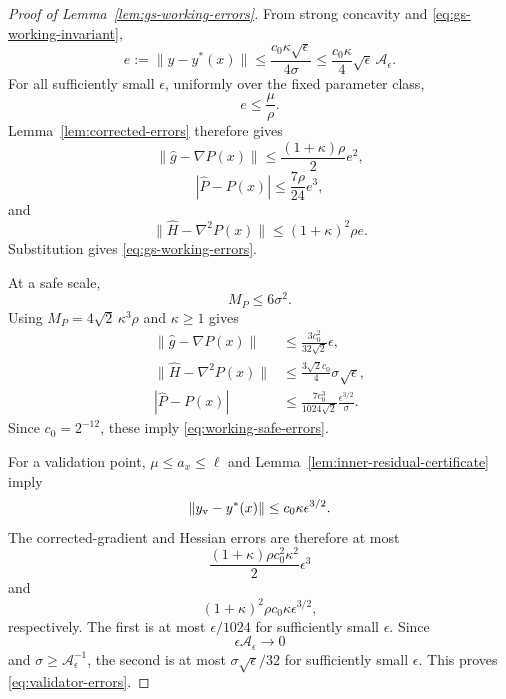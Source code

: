 \begin{proof}[Proof of Lemma~\ref{lem:gs-working-errors}]
From strong concavity and
\eqref{eq:gs-working-invariant},
\[
    e
    :=
    \|y-y^*(x)\|
    \le
    \frac{
        c_0\kappa\sqrt\epsilon
    }{
        4\sigma
    }
    \le
    \frac{c_0\kappa}{4}
    \sqrt\epsilon\,
    \mathcal A_\epsilon.
\]
For all sufficiently small $\epsilon$, uniformly over the fixed
parameter class,
\[
    e\le\frac{\mu}{\rho}.
\]
Lemma~\ref{lem:corrected-errors} therefore gives
\[
    \|\widehat g-\nabla P(x)\|
    \le
    \frac{(1+\kappa)\rho}{2}e^2,
\]
\[
    |\widehat P-P(x)|
    \le
    \frac{7\rho}{24}e^3,
\]
and
\[
    \|\widehat H-\nabla^2P(x)\|
    \le
    (1+\kappa)^2\rho e.
\]
Substitution gives
\eqref{eq:gs-working-errors}.

At a safe scale,
\[
    M_P\le6\sigma^2.
\]
Using
$M_P=4\sqrt2\,\kappa^3\rho$ and $\kappa\ge1$ gives
\begin{align*}
    \|\widehat g-\nabla P(x)\|
    &\le
    \frac{3c_0^2}{32\sqrt2}\epsilon,
    \\
    \|\widehat H-\nabla^2P(x)\|
    &\le
    \frac{3\sqrt2c_0}{4}
    \sigma\sqrt\epsilon,
    \\
    |\widehat P-P(x)|
    &\le
    \frac{7c_0^3}{1024\sqrt2}
    \frac{\epsilon^{3/2}}{\sigma}.
\end{align*}
Since $c_0=2^{-12}$, these imply
\eqref{eq:working-safe-errors}.

For a validation point,
$\mu\le a_x\le\ell$ and
Lemma~\ref{lem:inner-residual-certificate} imply
\[
    \|y_{\rm v}-y^*(x)\|
    \le
    c_0\kappa\epsilon^{3/2}.
\]
The corrected-gradient and Hessian errors are therefore at most
\[
    \frac{
        (1+\kappa)\rho
        c_0^2\kappa^2
    }2
    \epsilon^3
\]
and
\[
    (1+\kappa)^2\rho
    c_0\kappa
    \epsilon^{3/2},
\]
respectively.
The first is at most $\epsilon/1024$ for sufficiently small
$\epsilon$.
Since
\[
    \epsilon\mathcal A_\epsilon\to0
\]
and
$\sigma\ge\mathcal A_\epsilon^{-1}$,
the second is at most
$\sigma\sqrt\epsilon/32$ for sufficiently small $\epsilon$.
This proves \eqref{eq:validator-errors}.
\end{proof}


